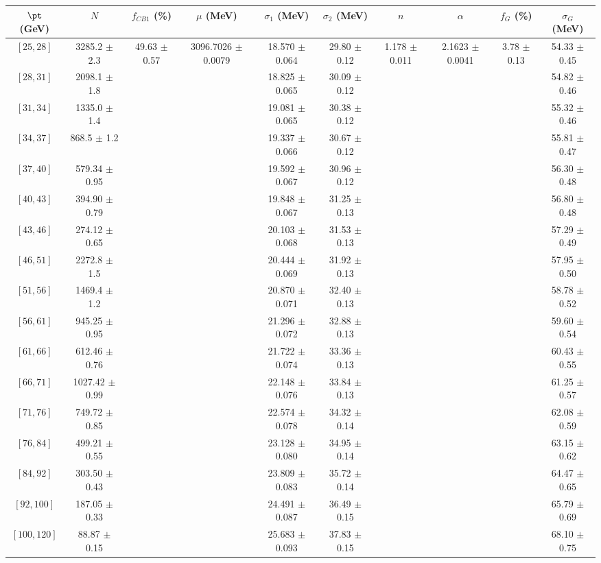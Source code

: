 \begin{tabular}{c||c|c|c|c|c|c|c|c|c}
$\pt$ (GeV) & $N$ & $f_{CB1}$ (\%)  & $\mu$ (MeV) & $\sigma_1$ (MeV) & $\sigma_2$ (MeV) & $n$ & $\alpha$ & $f_G$ (\%) & $\sigma_G$ (MeV) \\
\hline
$[25, 28]$ & 3285.2 $\pm$ 2.3 & \multirow{17}{*}{49.63 $\pm$ 0.57} & \multirow{17}{*}{3096.7026 $\pm$ 0.0079} & 18.570 $\pm$ 0.064 & 29.80 $\pm$ 0.12 & \multirow{17}{*}{1.178 $\pm$ 0.011} & \multirow{17}{*}{2.1623 $\pm$ 0.0041} & \multirow{17}{*}{3.78 $\pm$ 0.13} & 54.33 $\pm$ 0.45\\
$[28, 31]$ & 2098.1 $\pm$ 1.8 &  &  & 18.825 $\pm$ 0.065 & 30.09 $\pm$ 0.12 &  &  &  & 54.82 $\pm$ 0.46\\
$[31, 34]$ & 1335.0 $\pm$ 1.4 &  &  & 19.081 $\pm$ 0.065 & 30.38 $\pm$ 0.12 &  &  &  & 55.32 $\pm$ 0.46\\
$[34, 37]$ & 868.5 $\pm$ 1.2 &  &  & 19.337 $\pm$ 0.066 & 30.67 $\pm$ 0.12 &  &  &  & 55.81 $\pm$ 0.47\\
$[37, 40]$ & 579.34 $\pm$ 0.95 &  &  & 19.592 $\pm$ 0.067 & 30.96 $\pm$ 0.12 &  &  &  & 56.30 $\pm$ 0.48\\
$[40, 43]$ & 394.90 $\pm$ 0.79 &  &  & 19.848 $\pm$ 0.067 & 31.25 $\pm$ 0.13 &  &  &  & 56.80 $\pm$ 0.48\\
$[43, 46]$ & 274.12 $\pm$ 0.65 &  &  & 20.103 $\pm$ 0.068 & 31.53 $\pm$ 0.13 &  &  &  & 57.29 $\pm$ 0.49\\
$[46, 51]$ & 2272.8 $\pm$ 1.5 &  &  & 20.444 $\pm$ 0.069 & 31.92 $\pm$ 0.13 &  &  &  & 57.95 $\pm$ 0.50\\
$[51, 56]$ & 1469.4 $\pm$ 1.2 &  &  & 20.870 $\pm$ 0.071 & 32.40 $\pm$ 0.13 &  &  &  & 58.78 $\pm$ 0.52\\
$[56, 61]$ & 945.25 $\pm$ 0.95 &  &  & 21.296 $\pm$ 0.072 & 32.88 $\pm$ 0.13 &  &  &  & 59.60 $\pm$ 0.54\\
$[61, 66]$ & 612.46 $\pm$ 0.76 &  &  & 21.722 $\pm$ 0.074 & 33.36 $\pm$ 0.13 &  &  &  & 60.43 $\pm$ 0.55\\
$[66, 71]$ & 1027.42 $\pm$ 0.99 &  &  & 22.148 $\pm$ 0.076 & 33.84 $\pm$ 0.13 &  &  &  & 61.25 $\pm$ 0.57\\
$[71, 76]$ & 749.72 $\pm$ 0.85 &  &  & 22.574 $\pm$ 0.078 & 34.32 $\pm$ 0.14 &  &  &  & 62.08 $\pm$ 0.59\\
$[76, 84]$ & 499.21 $\pm$ 0.55 &  &  & 23.128 $\pm$ 0.080 & 34.95 $\pm$ 0.14 &  &  &  & 63.15 $\pm$ 0.62\\
$[84, 92]$ & 303.50 $\pm$ 0.43 &  &  & 23.809 $\pm$ 0.083 & 35.72 $\pm$ 0.14 &  &  &  & 64.47 $\pm$ 0.65\\
$[92, 100]$ & 187.05 $\pm$ 0.33 &  &  & 24.491 $\pm$ 0.087 & 36.49 $\pm$ 0.15 &  &  &  & 65.79 $\pm$ 0.69\\
$[100, 120]$ & 88.87 $\pm$ 0.15 &  &  & 25.683 $\pm$ 0.093 & 37.83 $\pm$ 0.15 &  &  &  & 68.10 $\pm$ 0.75\\
\end{tabular}
